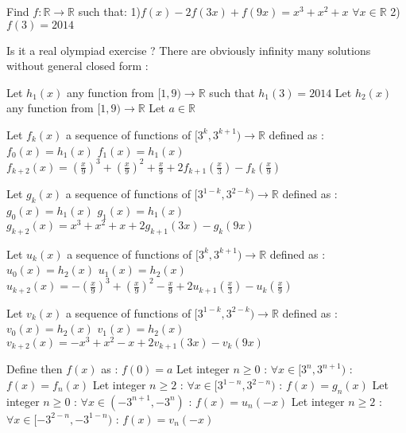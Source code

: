 \begin{solution}
	\begin{tcolorbox}Find $f:\mathbb{R}\rightarrow \mathbb{R}$ such that:
1)$f(x)-2f(3x)+f(9x)=x^3+x^2+x$ $\forall x\in \mathbb{R}$
2)$f(3)=2014$\end{tcolorbox}
Is it a real olympiad exercise ?
There are obviously infinity many solutions without general closed form :

Let $h_1(x)$ any function from $[1,9)\to \mathbb R$ such that $h_1(3)=2014$
Let $h_2(x)$ any function from $[1,9)\to \mathbb R$
Let $a\in\mathbb R$

Let $f_k(x)$ a sequence of functions of $[3^{k},3^{k+1})\to \mathbb R$ defined as :
$f_0(x)=h_1(x)$
$f_1(x)=h_1(x)$
$f_{k+2}(x)=(\frac x9)^3+(\frac x9)^2+\frac x9+2f_{k+1}(\frac x3)-f_{k}(\frac x9)$

Let $g_k(x)$ a sequence of functions of $[3^{1-k},3^{2-k})\to \mathbb R$ defined as :
$g_0(x)=h_1(x)$
$g_1(x)=h_1(x)$
$g_{k+2}(x)=x^3+x^2+x+2g_{k+1}(3x)-g_k(9x)$

Let $u_k(x)$ a sequence of functions of $[3^{k},3^{k+1})\to \mathbb R$ defined as :
$u_0(x)=h_2(x)$
$u_1(x)=h_2(x)$
$u_{k+2}(x)=-(\frac x9)^3+(\frac x9)^2-\frac x9+2u_{k+1}(\frac x3)-u_{k}(\frac x9)$

Let $v_k(x)$ a sequence of functions of $[3^{1-k},3^{2-k})\to \mathbb R$ defined as :
$v_0(x)=h_2(x)$
$v_1(x)=h_2(x)$
$v_{k+2}(x)=-x^3+x^2-x+2v_{k+1}(3x)-v_k(9x)$

Define then $f(x)$ as :
$f(0)=a$
Let integer $n\ge 0$ : $\forall x\in[3^n,3^{n+1})$ : $f(x)=f_n(x)$
Let integer $n\ge 2$  : $\forall x\in[3^{1-n},3^{2-n})$ : $f(x)=g_n(x)$
Let integer $n\ge 0$ : $\forall x\in(-3^{n+1},-3^{n})$ : $f(x)=u_n(-x)$
Let integer $n\ge 2$  : $\forall x\in[-3^{2-n},-3^{1-n})$ : $f(x)=v_n(-x)$
\end{solution}




